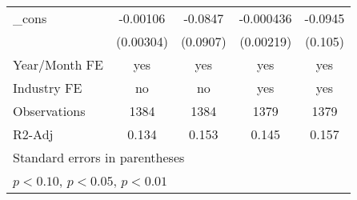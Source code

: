 {\begin{tabular}{l*{4}{c}}
\_cons          & -0.00106         &  -0.0847         &-0.000436         &  -0.0945         \\
                &(0.00304)         & (0.0907)         &(0.00219)         &  (0.105)         \\
\hline
Year/Month FE   &      yes         &      yes         &      yes         &      yes         \\
Industry FE     &       no         &       no         &      yes         &      yes         \\
Observations    &     1384         &     1384         &     1379         &     1379         \\
R2-Adj          &    0.134         &    0.153         &    0.145         &    0.157         \\
\hline\hline
\multicolumn{5}{l}{\footnotesize Standard errors in parentheses}\\
\multicolumn{5}{l}{\footnotesize \sym{*} \(p<0.10\), \sym{**} \(p<0.05\), \sym{***} \(p<0.01\)}\\
\end{tabular}
}
